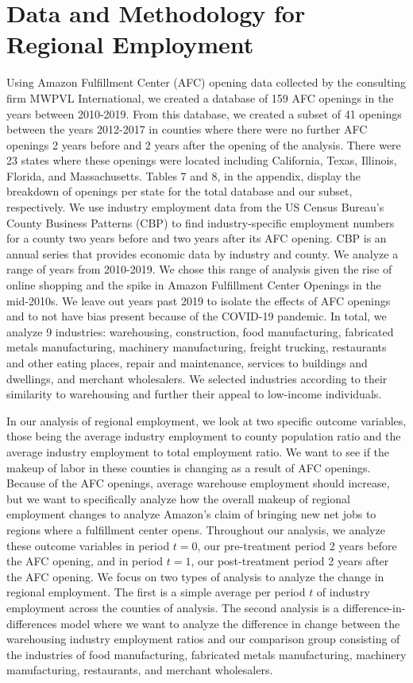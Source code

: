 \documentclass[11pt]{article}
\begin{document}
\section{Data and Methodology for Regional Employment}
\-\hspace{0.5cm} Using Amazon Fulfillment Center (AFC) opening data collected by the consulting firm MWPVL International, we created a database of 159 AFC openings in the years between 2010-2019. From this database, we created a subset of 41 openings between the years 2012-2017 in counties where there were no further AFC openings 2 years before and 2 years after the opening of the analysis. There were 23 states where these openings were located including California, Texas, Illinois, Florida, and Massachusetts. Tables 7 and 8, in the appendix, display the breakdown of openings per state for the total database and our subset, respectively. We use industry employment data from the US Census Bureau’s County Business Patterns (CBP) to find industry-specific employment numbers for a county two years before and two years after its AFC opening. CBP is an annual series that provides economic data by industry and county. We analyze a range of years from 2010-2019. We chose this range of analysis given the rise of online shopping and the spike in Amazon Fulfillment Center Openings in the mid-2010s. We leave out years past 2019 to isolate the effects of AFC openings and to not have bias present because of the COVID-19 pandemic. In total, we analyze 9 industries: warehousing, construction, food manufacturing, fabricated metals manufacturing, machinery manufacturing, freight trucking, restaurants and other eating places, repair and maintenance, services to buildings and dwellings, and merchant wholesalers. We selected industries according to their similarity to warehousing and further their appeal to low-income individuals. 

\-\hspace{0.5cm} In our analysis of regional employment, we look at two specific outcome variables, those being the average industry employment to county population ratio and the average industry employment to total employment ratio. We want to see if the makeup of labor in these counties is changing as a result of AFC openings. Because of the AFC openings, average warehouse employment should increase, but we want to specifically analyze how the overall makeup of regional employment changes to analyze Amazon's claim of bringing new net jobs to regions where a fulfillment center opens. Throughout our analysis, we analyze these outcome variables in period $t = 0$, our pre-treatment period 2 years before the AFC opening, and in period $t = 1$, our post-treatment period 2 years after the AFC opening. We focus on two types of analysis to analyze the change in regional employment. The first is a simple average per period $t$ of industry employment across the counties of analysis. The second analysis is a difference-in-differences model where we want to analyze the difference in change between the warehousing industry employment ratios and our comparison group consisting of the industries of food manufacturing, fabricated metals manufacturing, machinery manufacturing, restaurants, and merchant wholesalers.
\end{document}
